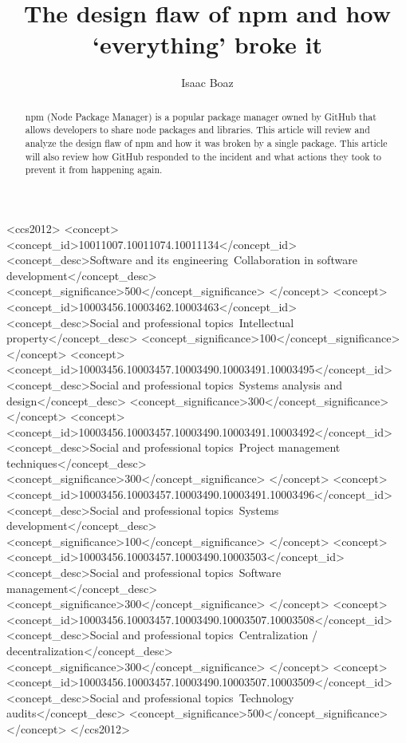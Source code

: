 \documentclass[acmsmall]{acmart}
\begin{document}
\title{The design flaw of npm and how `everything' broke it}

\author{Isaac Boaz}

\renewcommand{\shortauthors}{Boaz}

\begin{abstract}
  npm (Node Package Manager) is a popular package manager owned by GitHub that allows developers
  to share node packages and libraries. This article will review and analyze the design flaw of npm
  and how it was broken by a single package. This article will also review how GitHub responded to
  the incident and what actions they took to prevent it from happening again.
\end{abstract}


\begin{CCSXML}
  <ccs2012>
  <concept>
  <concept_id>10011007.10011074.10011134</concept_id>
  <concept_desc>Software and its engineering~Collaboration in software development</concept_desc>
  <concept_significance>500</concept_significance>
  </concept>
  <concept>
  <concept_id>10003456.10003462.10003463</concept_id>
  <concept_desc>Social and professional topics~Intellectual property</concept_desc>
  <concept_significance>100</concept_significance>
  </concept>
  <concept>
  <concept_id>10003456.10003457.10003490.10003491.10003495</concept_id>
  <concept_desc>Social and professional topics~Systems analysis and design</concept_desc>
  <concept_significance>300</concept_significance>
  </concept>
  <concept>
  <concept_id>10003456.10003457.10003490.10003491.10003492</concept_id>
  <concept_desc>Social and professional topics~Project management techniques</concept_desc>
  <concept_significance>300</concept_significance>
  </concept>
  <concept>
  <concept_id>10003456.10003457.10003490.10003491.10003496</concept_id>
  <concept_desc>Social and professional topics~Systems development</concept_desc>
  <concept_significance>100</concept_significance>
  </concept>
  <concept>
  <concept_id>10003456.10003457.10003490.10003503</concept_id>
  <concept_desc>Social and professional topics~Software management</concept_desc>
  <concept_significance>300</concept_significance>
  </concept>
  <concept>
  <concept_id>10003456.10003457.10003490.10003507.10003508</concept_id>
  <concept_desc>Social and professional topics~Centralization / decentralization</concept_desc>
  <concept_significance>300</concept_significance>
  </concept>
  <concept>
  <concept_id>10003456.10003457.10003490.10003507.10003509</concept_id>
  <concept_desc>Social and professional topics~Technology audits</concept_desc>
  <concept_significance>500</concept_significance>
  </concept>
  </ccs2012>
\end{CCSXML}
\end{document}
